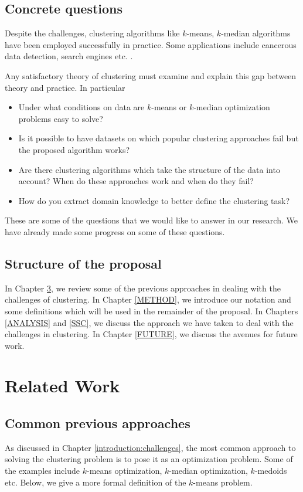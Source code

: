 \documentclass[letterpaper,12pt,titlepage,oneside,final]{book}
\begin{document}
\section{Concrete questions}
Despite the challenges, clustering algorithms like $k$-means, $k$-median algorithms have been employed successfully in practice. Some applications include cancerous data detection, search engines etc. \cite{wang2005comparison,liu2007clustering}. 

Any satisfactory theory of clustering must examine and explain this gap between theory and practice. In particular

\begin{itemize}
	\item Under what conditions on data are $k$-means or $k$-median optimization problems easy to solve?
	\item Is it possible to have datasets on which popular clustering approaches fail but the proposed algorithm works?
	\item Are there clustering algorithms which take the structure of the data into account? When do these approaches work and when do they fail?
	\item How do you extract domain knowledge to better define the clustering task?
\end{itemize}

These are some of the questions that we would like to answer in our research. We have already made some progress on some of these questions. 

\section{Structure of the proposal}
In Chapter \ref{RLW}, we review some of the previous approaches in dealing with the challenges of clustering. In Chapter \ref{METHOD}, we introduce our notation and some definitions which will be used in the remainder of the proposal. In Chapters \ref{ANALYSIS} and \ref{SSC}, we discuss the approach we have taken to deal with the challenges in clustering. In Chapter \ref{FUTURE}, we discuss the avenues for future work. 

\chapter{Related Work}
\label{RLW}
\section{Common previous approaches}
As discussed in Chapter \ref{introduction:challenges}, the most common approach to solving the clustering problem is to pose it as an optimization problem. Some of the examples include $k$-means optimization, $k$-median optimization, $k$-medoids etc. Below, we give a more formal definition of the $k$-means problem. 
\end{document}
